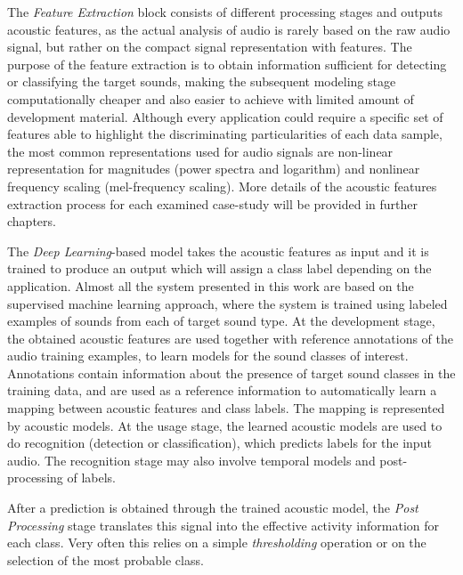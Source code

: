 The \textit{Feature Extraction} block consists
of different processing stages and outputs acoustic features, as the actual analysis of
audio is rarely based on the raw audio signal, but rather on the compact signal
representation with features. The purpose of the feature extraction is to obtain
information sufficient for detecting or classifying the target sounds, making the
subsequent modeling stage computationally cheaper and also easier to achieve with
limited amount of development material.
Although every application could require a specific set of features able to highlight the discriminating particularities of each data sample, the most common representations used
for audio signals are non-linear representation for magnitudes (power spectra and logarithm) and nonlinear frequency scaling (mel-frequency scaling). More details of the acoustic features extraction process for each examined case-study will be provided in further chapters.


The \textit{Deep Learning}-based model takes the acoustic features as input and it is trained to produce an output which will assign a class label depending on the application. Almost all the system presented in this work are
based on the supervised machine learning approach, where the system is trained
using labeled examples of sounds from each of target sound type. 
At the development stage, the obtained acoustic features are used together with
reference annotations of the audio training examples, to learn models for the
sound classes of interest. Annotations contain information about the presence of
target sound classes in the training data, and are used as a reference information
to automatically learn a mapping between acoustic features and class labels. The
mapping is represented by acoustic models. At the usage stage, the learned acoustic
models are used to do recognition (detection or classification), which predicts labels
for the input audio. The recognition stage may also involve temporal models and
post-processing of labels.

After a prediction is obtained through the trained acoustic model, the \textit{Post Processing} stage translates this signal into the effective activity information for each class. Very often this relies on a simple \textit{thresholding} operation or on the selection of the most probable class.



